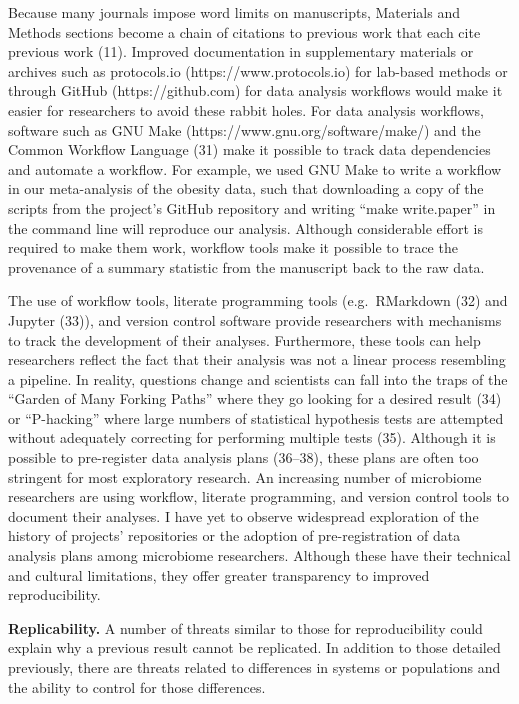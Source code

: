\documentclass[]{article}
\begin{document}
Because many journals impose word limits on manuscripts, Materials and
Methods sections become a chain of citations to previous work that each
cite previous work (11). Improved documentation in supplementary
materials or archives such as protocols.io (https://www.protocols.io)
for lab-based methods or through GitHub (https://github.com) for data
analysis workflows would make it easier for researchers to avoid these
rabbit holes. For data analysis workflows, software such as GNU Make
(https://www.gnu.org/software/make/) and the Common Workflow Language
(31) make it possible to track data dependencies and automate a
workflow. For example, we used GNU Make to write a workflow in our
meta-analysis of the obesity data, such that downloading a copy of the
scripts from the project's GitHub repository and writing ``make
write.paper'' in the command line will reproduce our analysis. Although
considerable effort is required to make them work, workflow tools make
it possible to trace the provenance of a summary statistic from the
manuscript back to the raw data.

The use of workflow tools, literate programming tools (e.g.~RMarkdown
(32) and Jupyter (33)), and version control software provide researchers
with mechanisms to track the development of their analyses. Furthermore,
these tools can help researchers reflect the fact that their analysis
was not a linear process resembling a pipeline. In reality, questions
change and scientists can fall into the traps of the ``Garden of Many
Forking Paths'' where they go looking for a desired result (34) or
``P-hacking'' where large numbers of statistical hypothesis tests are
attempted without adequately correcting for performing multiple tests
(35). Although it is possible to pre-register data analysis plans
(36--38), these plans are often too stringent for most exploratory
research. An increasing number of microbiome researchers are using
workflow, literate programming, and version control tools to document
their analyses. I have yet to observe widespread exploration of the
history of projects' repositories or the adoption of pre-registration of
data analysis plans among microbiome researchers. Although these have
their technical and cultural limitations, they offer greater
transparency to improved reproducibility.

\textbf{Replicability.} A number of threats similar to those for
reproducibility could explain why a previous result cannot be
replicated. In addition to those detailed previously, there are threats
related to differences in systems or populations and the ability to
control for those differences.
\end{document}
